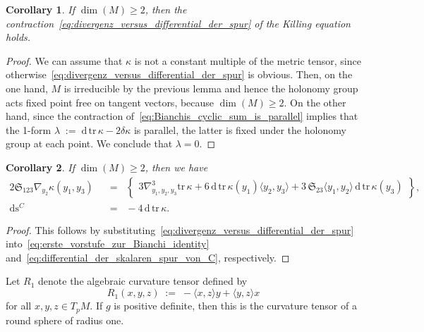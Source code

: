 \documentclass[11pt,a4paper]{article}
\theoremstyle{plain}
\newtheorem{corollary}{Corollary}
\theoremstyle{remark}
\newcommand{\cyclic}{\mathfrak{S}}
\renewcommand{\d}{\mathrm{d}}
\newcommand{\trace}{\mathrm{tr}}
\newcommand{\scal}{\mathrm{s}}
\begin{document}
\bigskip
\begin{corollary}\label{co:contracted_Bianchi_identity}
If $\dim(M) \geq  2$, then the contraction~\eqref{eq:divergenz_versus_differential_der_spur} of the Killing equation holds.
\end{corollary}
\begin{proof} 
We can assume that $\kappa$ is not a constant multiple of the metric tensor,
since otherwise~\eqref{eq:divergenz_versus_differential_der_spur} is obvious. Then, on
the one hand, $M$ is irreducible by the previous lemma and hence the holonomy
group acts fixed point free on tangent vectors,  because $\dim(M)\geq 2$. On
the other hand, since the contraction
of~\eqref{eq:Bianchis_cyclic_sum_is_parallel} implies that the 1-form
$\lambda\;:=\;\d \, \trace \, \kappa - 2 \delta \kappa$ is parallel, the latter is fixed under the holonomy group at each point. We conclude that $\lambda = 0$.
\end{proof}

\bigskip
\begin{corollary}
If $\dim(M) \geq  2$, then we have
\begin{align}\label{eq:zweite_vorstufe_zur_Bianchi_identity}
2 \cyclic_{123} \nabla_{y_2} \kappa (y_1,y_3) &\;\;=\;\;\left \lbrace \begin{array}{c} 3\nabla^3_{y_1,y_2,y_3}\trace \, \kappa +  6\, \d \, \trace \, \kappa(y_1) \langle y_2,y_3\rangle  + 3\,\cyclic_{23}\langle y_1,y_2 \rangle\, \d \, \trace \, \kappa(y_3) \end{array} \right \rbrace,\\
\label{eq:vergleich_der_spur_von_kappa_mit_der_skalaren_kruemmung_von_C}
\d\scal^C &\;\;=\;\;-4\, \d\, \trace \, \kappa.
\end{align}
\end{corollary}
\begin{proof} This follows by substituting~\eqref{eq:divergenz_versus_differential_der_spur} into~\eqref{eq:erste_vorstufe_zur_Bianchi_identity} and~\eqref{eq:differential_der_skalaren_spur_von_C}, respectively.
\end{proof}


Let $R_1$ denote the algebraic curvature tensor defined by
\begin{equation}
R_1(x,y,z)\;:=\;- \langle x , z \rangle y + \langle y , z \rangle x
\end{equation}
for all $x,y,z\in T_pM$. If $g$ is positive definite, then this is the curvature tensor of a round
sphere of radius one.
\end{document}
